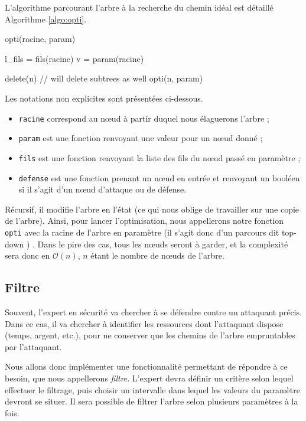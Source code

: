 		L'algorithme parcourant l'arbre à la recherche du chemin idéal est détaillé Algorithme \ref{algo:opti}.
		\begin{algorithm}[h!]
			\caption{opti(racine, param)}
			\label{algo:opti}
			\begin{algorithmic}
				\STATE l\_fils = fils(racine)
					\RETURN
				\ENDIF
				\STATE
					\STATE v = param(racine)

							\STATE delete(n) // will delete subtrees as well
						\ENDIF
					\ENDFOR
				\ENDIF
				\STATE
					\STATE opti(n, param)
				\ENDFOR
			\end{algorithmic}
		\end{algorithm}
		Les notations non explicites sont présentées ci-dessous.
		\begin{itemize}
			\item \verb|racine| correspond au nœud à partir duquel nous élaguerons l'arbre ;
			\item \verb|param| est une fonction renvoyant une valeur pour un nœud donné ;
			\item \verb|fils| est une fonction renvoyant la liste des fils du nœud passé en paramètre ;
			\item \verb|defense| est une fonction prenant un nœud en entrée et renvoyant un booléen si il s'agit d'un nœud d'attaque ou de défense.
		\end{itemize}
		Récursif, il modifie l'arbre en l'état (ce qui nous oblige de travailler sur une copie de l'arbre). 
		Ainsi, pour lancer l'optimisation, nous appellerons notre fonction \verb|opti| avec la racine de l'arbre en paramètre (il s'agit donc d'un parcours dit \og top-down \fg) . Dans le pire des cas, tous les nœuds seront à garder, et la complexité sera donc en $\mathcal{O}(n)$, $n$ étant le nombre de nœuds de l'arbre.

	\subsection{Filtre}
		\label{subsection:filtre} 

		Souvent, l'expert en sécurité va chercher à se défendre contre un attaquant précis. Dans ce cas, il va chercher à identifier les ressources dont l'attaquant dispose (temps, argent, etc.), pour ne conserver que les chemins de l'arbre empruntables par l'attaquant.

		Nous allons donc implémenter une fonctionnalité permettant de répondre à ce besoin, que nous appellerons \textit{filtre}. L'expert devra définir un critère selon lequel effectuer le filtrage, puis choisir un intervalle dans lequel les valeurs du paramètre devront se situer. Il sera possible de filtrer l'arbre selon plusieurs paramètres à la fois.

